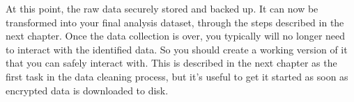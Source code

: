 At this point, the raw data securely stored and backed up.
It can now be transformed into your final analysis dataset,
through the steps described in the next chapter.
Once the data collection is over,
you typically will no longer need to interact with the identified data.
So you should create a working version of it that you can safely interact with.
This is described in the next chapter as the first task in the data cleaning process,
but it's useful to get it started as soon as encrypted data is downloaded to disk.
